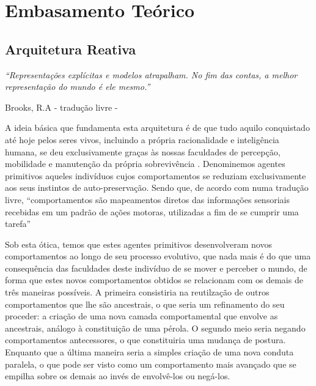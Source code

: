 \chapter{Embasamento Teórico} %
\section{Arquitetura Reativa}
\epigraph{ 
	  \textit{``Representações explícitas e modelos atrapalham. No fim das contas, a melhor representação do mundo é ele mesmo.''} 
	 }
	  { Brooks, R.A \cite{brooks} - tradução livre -} 
	  
A ideia básica que fundamenta esta arquitetura é de que tudo aquilo conquistado até hoje pelos seres vivos, incluindo a própria racionalidade e 
inteligência humana, se deu exclusivamente graças às nossas faculdades de percepção, mobilidade e manutenção da própria sobrevivência \cite{brooks}.
Denominemos agentes primitivos aqueles indivíduos cujos comportamentos se reduziam exclusivamente aos seus instintos de auto-preservação.
Sendo que, de acordo com \cite{murphy} numa tradução livre, ``comportamentos são mapeamentos diretos das informações sensoriais recebidas em um 
padrão de ações motoras, utilizadas a fim de se cumprir uma tarefa''

Sob esta ótica, temos que estes agentes primitivos desenvolveram novos comportamentos ao longo de seu processo evolutivo, que nada mais é do 
que uma consequência das faculdades deste indivíduo de se mover e perceber o mundo, de forma que estes novos comportamentos obtidos se relacionam com 
os demais de três maneiras possíveis.
A primeira consistiria na reutilzação de outros comportamentos que lhe são ancestrais, o que seria um refinamento do seu proceder: a criação de uma 
nova camada comportamental que envolve as ancestrais, análogo à constituição de uma pérola.
O segundo meio seria negando comportamentos antecessores, o que constituiria uma mudança de postura. 
Enquanto que a última maneira seria a simples criação de uma nova conduta paralela, o que pode ser visto como um comportamento mais avançado que se 
empilha sobre os demais ao invés de envolvê-los ou negá-los\cite{murphy}.

